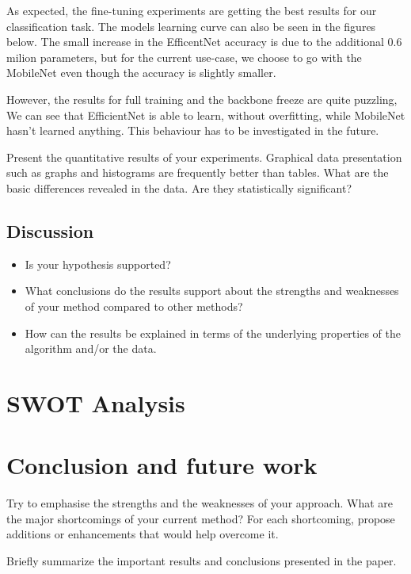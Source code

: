 \documentclass[runningheads,a4paper,11pt]{report}
\begin{document}
As expected, the fine-tuning experiments are getting the best results for our classification task. The models learning curve can also be seen in the figures below. The 
small increase in the EfficentNet accuracy is due to the additional 0.6 milion parameters, but for the current use-case, we choose to go with the MobileNet even though the accuracy is slightly smaller.  

However, the results for full training and the backbone freeze are quite puzzling, We can see that EfficientNet is able to learn, without overfitting, while MobileNet hasn't learned anything. This behaviour has to be investigated in the future.

Present the quantitative results of your experiments. Graphical data presentation such as graphs and histograms are frequently better than tables. What are the basic differences revealed in the data. Are they statistically significant?

\section{Discussion}
\label{section:discussion}

\begin{itemize}
	\item Is your hypothesis supported? 
	\item What conclusions do the results support about the strengths and weaknesses of your method compared to other methods? 
	\item How can the results be explained in terms of the underlying properties of the algorithm and/or the data. 
\end{itemize}


\chapter{SWOT Analysis}
\label{chapter:swot}


\chapter{Conclusion and future work}
\label{chapter:concl}

Try to emphasise the strengths and the weaknesses of your approach.
What are the major shortcomings of your current method? For each shortcoming, propose additions or enhancements that would help overcome it. 

Briefly summarize the important results and conclusions presented in the paper. 
\end{document}
